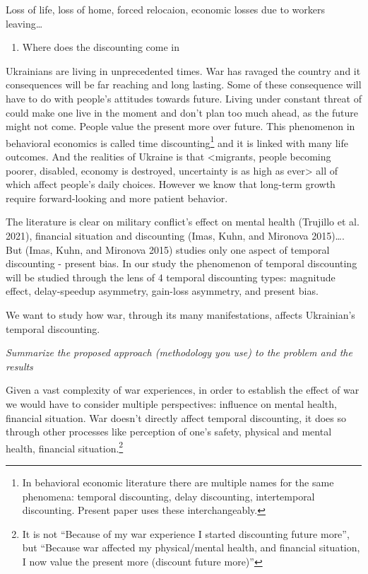 \documentclass[
  letterpaper,
  DIV=11,
  numbers=noendperiod]{scrartcl}
\providecommand{\tightlist}{%
  \setlength{\itemsep}{0pt}\setlength{\parskip}{0pt}}\usepackage{longtable,booktabs,array}
\begin{document}
Loss of life, loss of home, forced relocaion, economic losses due to
workers leaving\ldots{}

\begin{enumerate}
\def\labelenumi{\arabic{enumi}.}
\setcounter{enumi}{2}
\tightlist
\item
  Where does the discounting come in
\end{enumerate}

Ukrainians are living in unprecedented times. War has ravaged the
country and it consequences will be far reaching and long lasting. Some
of these consequence will have to do with people's attitudes towards
future. Living under constant threat of could make one live in the
moment and don't plan too much ahead, as the future might not come.
People value the present more over future. This phenomenon in behavioral
economics is called time discounting\footnote{In behavioral economic
  literature there are multiple names for the same phenomena: temporal
  discounting, delay discounting, intertemporal discounting. Present
  paper uses these interchangeably.} and it is linked with many life
outcomes. And the realities of Ukraine is that \textless migrants,
people becoming poorer, disabled, economy is destroyed, uncertainty is
as high as ever\textgreater{} all of which affect people's daily
choices. However we know that long-term growth require forward-looking
and more patient behavior.

The literature is clear on military conflict's effect on mental health
(Trujillo et al. 2021), financial situation and discounting (Imas, Kuhn,
and Mironova 2015)\ldots. But (Imas, Kuhn, and Mironova 2015) studies
only one aspect of temporal discounting - present bias. In our study the
phenomenon of temporal discounting will be studied through the lens of 4
temporal discounting types: magnitude effect, delay-speedup asymmetry,
gain-loss asymmetry, and present bias.

We want to study how war, through its many manifestations, affects
Ukrainian's temporal discounting.

\emph{Summarize the proposed approach (methodology you use) to the
problem and the results}

Given a vast complexity of war experiences, in order to establish the
effect of war we would have to consider multiple perspectives: influence
on mental health, financial situation. War doesn't directly affect
temporal discounting, it does so through other processes like perception
of one's safety, physical and mental health, financial
situation.\footnote{It is not ``Because of my war experience I started
  discounting future more'', but ``Because war affected my
  physical/mental health, and financial situation, I now value the
  present more (discount future more)''}
\end{document}
